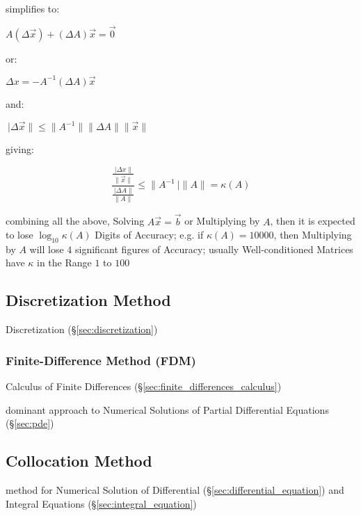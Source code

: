 simplifies to:

$A(\Delta\vec{x}) + (\Delta A)\vec{x} = \vec{0}$

or:

$\Delta x = -A^{-1}(\Delta A)\vec{x}$

and:

$\ |\Delta\vec{x}\| \leq \|A^{-1}\| \|\Delta{A}\| \|\vec{x}\|$

giving:

\[
  \frac{
    \frac{\ |\Delta{x}\|}{\|\vec{x}\|}
  }{
    \frac{\ |\Delta{A}\|}{\|A\|}
  }
  \leq \|A^{-1}\ |\|A\| = \kappa(A)
\]

combining all the above, Solving $A\vec{x} = \vec{b}$ or Multiplying by $A$,
then it is expected to lose $\log_{10} \kappa(A)$ Digits of Accuracy; e.g. if
$\kappa(A) = 10000$, then Multiplying by $A$ will lose $4$ significant figures
of Accuracy; usually Well-conditioned Matrices have $\kappa$ in the Range $1$
to $100$



\subsection{Discretization Method}\label{sec:discretization_method}

Discretization (\S\ref{sec:discretization})



\subsubsection{Finite-Difference Method (FDM)}\label{sec:fdm}

Calculus of Finite Differences (\S\ref{sec:finite_differences_calculus})

dominant approach to Numerical Solutions of Partial Differential Equations
(\S\ref{sec:pde})



\subsection{Collocation Method}\label{sec:collocation_method}

method for Numerical Solution of Differential
(\S\ref{sec:differential_equation}) and Integral Equations
(\S\ref{sec:integral_equation})

